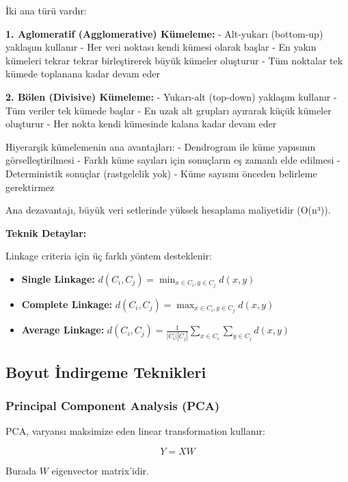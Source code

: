 İki ana türü vardır:

\textbf{1. Aglomeratif (Agglomerative) Kümeleme:}
- Alt-yukarı (bottom-up) yaklaşım kullanır
- Her veri noktası kendi kümesi olarak başlar
- En yakın kümeleri tekrar tekrar birleştirerek büyük kümeler oluşturur
- Tüm noktalar tek kümede toplanana kadar devam eder

\textbf{2. Bölen (Divisive) Kümeleme:}
- Yukarı-alt (top-down) yaklaşım kullanır
- Tüm veriler tek kümede başlar
- En uzak alt grupları ayırarak küçük kümeler oluşturur
- Her nokta kendi kümesinde kalana kadar devam eder

Hiyerarşik kümelemenin ana avantajları:
- Dendrogram ile küme yapısının görselleştirilmesi
- Farklı küme sayıları için sonuçların eş zamanlı elde edilmesi
- Deterministik sonuçlar (rastgelelik yok)
- Küme sayısını önceden belirleme gerektirmez

\newpage

Ana dezavantajı, büyük veri setlerinde yüksek hesaplama maliyetidir (O(n³)).

\textbf{Teknik Detaylar:}

Linkage criteria için üç farklı yöntem desteklenir:

\begin{itemize}
    \item \textbf{Single Linkage:} $d(C_i, C_j) = \min_{x \in C_i, y \in C_j} d(x,y)$
    \item \textbf{Complete Linkage:} $d(C_i, C_j) = \max_{x \in C_i, y \in C_j} d(x,y)$
    \item \textbf{Average Linkage:} $d(C_i, C_j) = \frac{1}{|C_i||C_j|} \sum_{x \in C_i} \sum_{y \in C_j} d(x,y)$
\end{itemize}

\subsection{Boyut İndirgeme Teknikleri}

\subsubsection{Principal Component Analysis (PCA)}

PCA, varyansı maksimize eden linear transformation kullanır:

\begin{equation}
Y = XW
\label{eq:pca_transform}
\end{equation}

Burada $W$ eigenvector matrix'idir.


